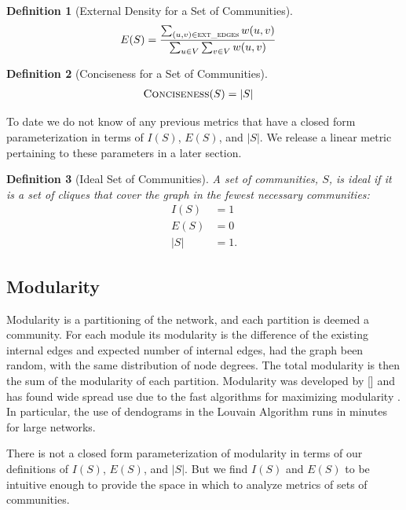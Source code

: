 \documentclass[conference]{IEEEtran}
\newtheorem{definition}{Definition}
\begin{document}
\begin{definition}[External Density for  a Set of Communities]
 \begin{align*}
  E(S) &= \frac{\sum_{(u,v) \in \text{\sc ext\_edges}}w(u,v)} {\sum_{u \in V}\sum_{v \in V} w(u,v) }
 \end{align*}
\end{definition}

\begin{definition}[Conciseness for  a Set of Communities]
 \begin{align*}
  \text{\sc Conciseness}(S) &= |S|
 \end{align*}
\end{definition}

To date we do not know of any previous metrics that have a closed form parameterization in terms of $I(S)$, $E(S)$, and $|S|$.  We release a linear metric pertaining to these parameters in a later section.

\begin{definition}[Ideal Set of Communities]
 A set of communities, $S$, is ideal if it is a set of cliques that cover the graph in the fewest necessary communities:
  \begin{align*}
   I(S) &= 1 \\
   E(S) &= 0 \\
  |S| &= 1. 
  \end{align*}
\end{definition}

\subsection{Modularity}

Modularity is a partitioning of the network, and each partition is deemed a community.  For each module its modularity is the difference of the existing internal edges and expected number of internal edges, had the graph been random, with the same distribution of node degrees.  The total modularity is then the sum of the modularity of each partition.  Modularity was developed by [] and has found wide spread use due to the fast algorithms for maximizing modularity \cite{modularity}.  In particular, the use of dendograms in the Louvain Algorithm \cite{louvain} runs in minutes for large networks.

There is not a closed form parameterization of modularity in terms of our definitions of $I(S)$, $E(S)$, and $|S|$.  But we find $I(S)$ and $E(S)$ to be intuitive enough to provide the space in which to analyze metrics of sets of communities.
\end{document}
